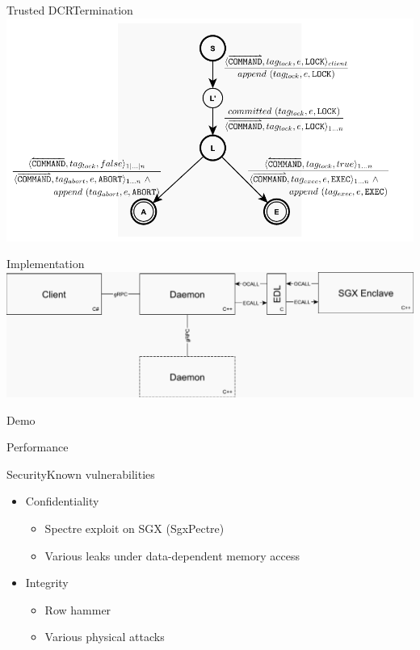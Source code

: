 \documentclass{beamer}
\begin{document}
\begin{frame}{Trusted DCR}{Termination}%
  \vfill
  \includegraphics[width=\textwidth]{figures/raft-2pc.pdf}
  \vfill
\end{frame}

\begin{frame}{Implementation}%
  \vfill
  \includegraphics[width=\textwidth]{figures/network-stack.pdf}
  \vfill
\end{frame}

\begin{frame}{Demo}%

\end{frame}

\begin{frame}{Performance}%

\end{frame}

\begin{frame}{Security}{Known vulnerabilities}%
  \begin{itemize}
    \item Confidentiality
    \begin{itemize}
      \item Spectre exploit on SGX (SgxPectre)
      \item Various leaks under data-dependent memory access
    \end{itemize}

    \vfill

    \item Integrity
    \begin{itemize}
      \item Row hammer
      \item Various physical attacks
    \end{itemize}
  \end{itemize}
\end{frame}
\end{document}
